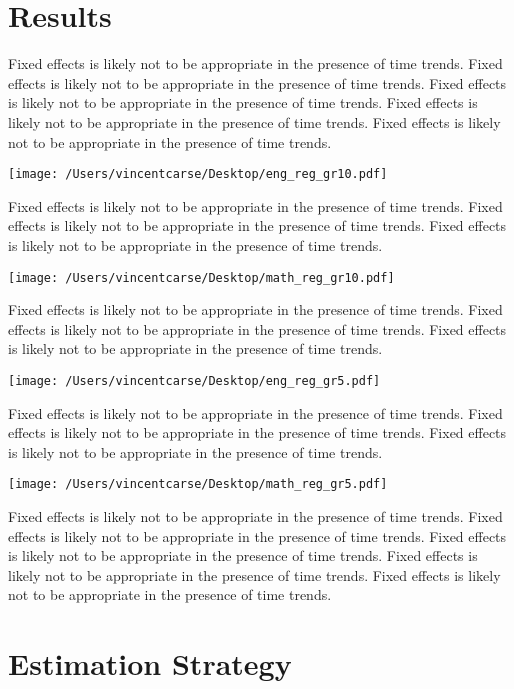 \documentclass[11pt]{article}
\begin{document}
\section{Results}

Fixed effects is likely not to be appropriate in the presence of time trends. 
Fixed effects is likely not to be appropriate in the presence of time trends. 
Fixed effects is likely not to be appropriate in the presence of time trends. 
Fixed effects is likely not to be appropriate in the presence of time trends. 
Fixed effects is likely not to be appropriate in the presence of time trends. 

\texttt{[image: /Users/vincentcarse/Desktop/eng\_reg\_gr10.pdf]}

Fixed effects is likely not to be appropriate in the presence of time trends. 
Fixed effects is likely not to be appropriate in the presence of time trends. 
Fixed effects is likely not to be appropriate in the presence of time trends. 


\texttt{[image: /Users/vincentcarse/Desktop/math\_reg\_gr10.pdf]}

Fixed effects is likely not to be appropriate in the presence of time trends. 
Fixed effects is likely not to be appropriate in the presence of time trends. 
Fixed effects is likely not to be appropriate in the presence of time trends. 


\texttt{[image: /Users/vincentcarse/Desktop/eng\_reg\_gr5.pdf]}

Fixed effects is likely not to be appropriate in the presence of time trends. 
Fixed effects is likely not to be appropriate in the presence of time trends. 
Fixed effects is likely not to be appropriate in the presence of time trends. 


\texttt{[image: /Users/vincentcarse/Desktop/math\_reg\_gr5.pdf]}


Fixed effects is likely not to be appropriate in the presence of time trends. 
Fixed effects is likely not to be appropriate in the presence of time trends. 
Fixed effects is likely not to be appropriate in the presence of time trends. 
Fixed effects is likely not to be appropriate in the presence of time trends. 
Fixed effects is likely not to be appropriate in the presence of time trends. 



\section{Estimation Strategy}
\end{document}
